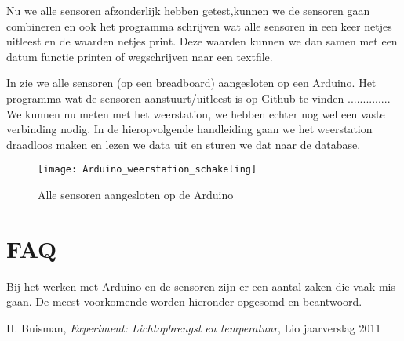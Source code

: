 Nu we alle sensoren afzonderlijk hebben getest,kunnen we de sensoren gaan combineren en ook het programma schrijven wat alle 
sensoren in een keer netjes uitleest en de waarden netjes print.
Deze waarden kunnen we dan samen met een datum functie printen of wegschrijven naar een textfile.

In  zie we alle sensoren (op
een breadboard) aangesloten op een Arduino. Het programma wat de
sensoren aanstuurt/uitleest is op Github te vinden .............. We
kunnen nu meten met het weerstation, we hebben echter nog wel een vaste
verbinding nodig. In de hieropvolgende handleiding gaan we het
weerstation draadloos maken en lezen we data uit en sturen we dat naar
de \hisparc database.




\begin{figure}
    \centering
    \texttt{[image: Arduino\_weerstation\_schakeling]}
    \caption{Alle sensoren aangesloten op de Arduino}
   \label{fig:Arduino_weerstation_schakeling}
\end{figure}


\section{FAQ}

Bij het werken met Arduino en de sensoren zijn er een aantal zaken die vaak mis
gaan. De meest voorkomende worden hieronder opgesomd en beantwoord.



 



\begin{thebibliography}{9}
        H. Buisman, \emph{\hisparc Experiment: Lichtopbrengst en temperatuur}, 
        Lio jaarverslag 2011
\end{thebibliography}



